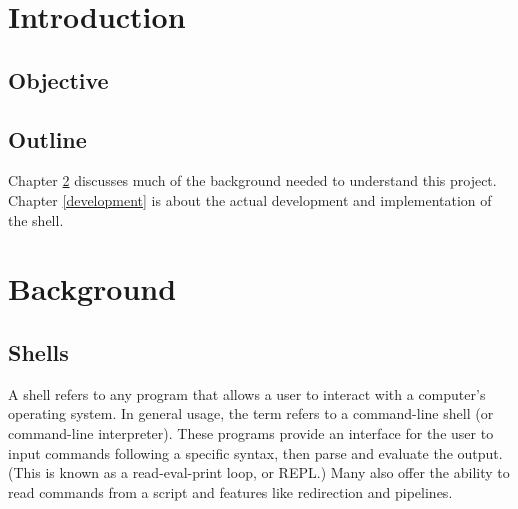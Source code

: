 \documentclass[12pt,twoside]{report} %
\begin{document}
	\afterpage{\blankpage{}}

	\chapter{Introduction}
	

	\section{Objective}

	\section{Outline}
	Chapter \ref{background} discusses much of the background needed to understand this project. Chapter \ref{development} is about the actual development and implementation of the shell.

	\chapter{Background} \label{background}

	\section{Shells} \label{sec:shells}
	A shell refers to any program that allows a user to interact with a computer's operating system. In general usage, the term refers to a command-line shell (or command-line interpreter). These programs provide an interface for the user to input commands following a specific syntax, then parse and evaluate the output. (This is known as a read-eval-print loop, or REPL.) Many also offer the ability to read commands from a script and features like redirection and pipelines.
\end{document}
